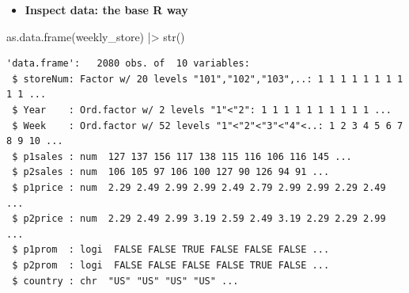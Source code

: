 \documentclass[
  ignorenonframetext,
]{beamer}
\newenvironment{Shaded}{\begin{snugshade}}{\end{snugshade}}
\newcommand{\FunctionTok}[1]{\textcolor[rgb]{0.28,0.35,0.67}{#1}}
\newcommand{\NormalTok}[1]{\textcolor[rgb]{0.00,0.23,0.31}{#1}}
\newcommand{\SpecialCharTok}[1]{\textcolor[rgb]{0.37,0.37,0.37}{#1}}
\providecommand{\tightlist}{%
  \setlength{\itemsep}{0pt}\setlength{\parskip}{0pt}}\usepackage{longtable,booktabs,array}
\begin{document}
\begin{frame}[fragile]{}
\label{section-5}
\begin{itemize}
\tightlist
\item
  \textbf{Inspect data: the base R way}
\end{itemize}

\tiny

\begin{Shaded}
\begin{Highlighting}[]
\FunctionTok{as.data.frame}\NormalTok{(weekly\_store) }\SpecialCharTok{|\textgreater{}} \FunctionTok{str}\NormalTok{()}
\end{Highlighting}
\end{Shaded}

\begin{verbatim}
'data.frame':   2080 obs. of  10 variables:
 $ storeNum: Factor w/ 20 levels "101","102","103",..: 1 1 1 1 1 1 1 1 1 1 ...
 $ Year    : Ord.factor w/ 2 levels "1"<"2": 1 1 1 1 1 1 1 1 1 1 ...
 $ Week    : Ord.factor w/ 52 levels "1"<"2"<"3"<"4"<..: 1 2 3 4 5 6 7 8 9 10 ...
 $ p1sales : num  127 137 156 117 138 115 116 106 116 145 ...
 $ p2sales : num  106 105 97 106 100 127 90 126 94 91 ...
 $ p1price : num  2.29 2.49 2.99 2.99 2.49 2.79 2.99 2.99 2.29 2.49 ...
 $ p2price : num  2.29 2.49 2.99 3.19 2.59 2.49 3.19 2.29 2.29 2.99 ...
 $ p1prom  : logi  FALSE FALSE TRUE FALSE FALSE FALSE ...
 $ p2prom  : logi  FALSE FALSE FALSE FALSE TRUE FALSE ...
 $ country : chr  "US" "US" "US" "US" ...
\end{verbatim}
\end{frame}
\end{document}
